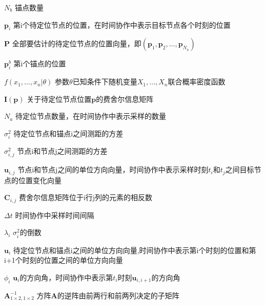 \begin{denotation}[3cm]
\item[$N_b$] 锚点数量
\item[$\bm{p}_i$] 第i个待定位节点的位置，在时间协作中表示目标节点各个时刻的位置
\item[$\bm{P}$] 全部要估计的待定位节点的位置向量，即$(\bm{p}_1,\bm{p}_2,\dots,\bm{p}_{N_a})$
\item[$\bm{p}^b_i$] 第i个锚点的位置
\item[$f(x_1,\dots,x_n|\theta)$] 参数$\theta$已知条件下随机变量$X_1,\dots,X_n$联合概率密度函数
\item[$\bm{I}(\bm{p})$] 关于待定位节点位置$\bm{p}$的费舍尔信息矩阵
\item[$N_a$] 待定位节点数量，在时间协作中表示采样的数量
\item[$\sigma^2_{i}$] 待定位节点和锚点i之间测距的方差
\item[$\sigma^2_{i,j}$] 节点i和节点j之间测距的方差
\item[$\bm{u}_{i,j}$] 节点i和节点j之间的单位方向向量，时间协作中表示采样时刻$t_i$和$t_j$之间目标节点的位置变化向量
\item[$\bm{C}_{i,j}$] 费舍尔信息矩阵位于i行j列的元素的相反数
\item[$\Delta t$] 时间协作中采样时间间隔
\item[$\lambda_{i}$] $\sigma^2_{i}$的倒数
\item[$\bm{u}_i$] 待定位节点和锚点i之间的单位方向向量,时间协作中表示第i个时刻的位置和第i+1个时刻的位置之间的单位方向向量
\item[$\phi_i$] $\bm{u}_i$的方向角，时间协作中表示第$t_i$时刻$\bm{u}_{i,i+1}$的方向角
\item[$\bm{A}^{-1}_{1\times2,1\times2}$] 方阵$\bm{A}$的逆阵由前两行和前两列决定的子矩阵
\end{denotation}
